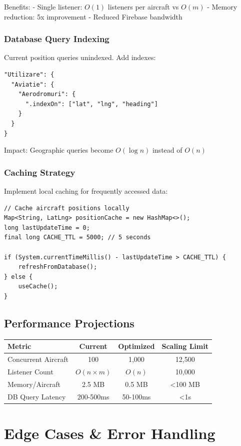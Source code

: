 \documentclass[11pt,a4paper]{report}
\begin{document}
Benefits:
- Single listener: $O(1)$ listeners per aircraft vs $O(m)$
- Memory reduction: 5x improvement
- Reduced Firebase bandwidth

\subsection{Database Query Indexing}

Current position queries unindexed. Add indexes:

\begin{lstlisting}
"Utilizare": {
  "Aviatie": {
    "Aerodromuri": {
      ".indexOn": ["lat", "lng", "heading"]
    }
  }
}
\end{lstlisting}

Impact: Geographic queries become $O(\log n)$ instead of $O(n)$

\subsection{Caching Strategy}

Implement local caching for frequently accessed data:

\begin{lstlisting}
// Cache aircraft positions locally
Map<String, LatLng> positionCache = new HashMap<>();
long lastUpdateTime = 0;
final long CACHE_TTL = 5000; // 5 seconds

if (System.currentTimeMillis() - lastUpdateTime > CACHE_TTL) {
    refreshFromDatabase();
} else {
    useCache();
}
\end{lstlisting}

\section{Performance Projections}

\begin{tabular}{|l|c|c|c|}
\hline
\textbf{Metric} & \textbf{Current} & \textbf{Optimized} & \textbf{Scaling Limit} \\
\hline
Concurrent Aircraft & 100 & 1,000 & 12,500 \\
Listener Count & $O(n \times m)$ & $O(n)$ & 10,000 \\
Memory/Aircraft & 2.5 MB & 0.5 MB & \textless 100 MB \\
DB Query Latency & 200-500ms & 50-100ms & \textless 1s \\
\hline
\end{tabular}

\chapter{Edge Cases \& Error Handling}
\end{document}
